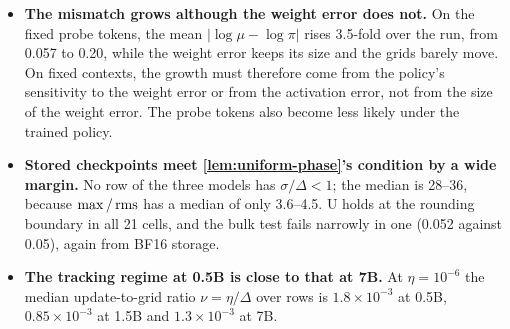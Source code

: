 \begin{itemize}[leftmargin=*,itemsep=2pt]
\begin{itemize}[leftmargin=*,itemsep=1pt]
  \end{itemize}
\item \textbf{The mismatch grows although the weight error does not.} On the fixed probe tokens, the mean $|\log\mu-\log\pi|$ rises 3.5-fold over the run, from 0.057 to 0.20, while the weight error keeps its size and the grids barely move. On fixed contexts, the growth must therefore come from the policy's sensitivity to the weight error or from the activation error, not from the size of the weight error. The probe tokens also become less likely under the trained policy.
\item \textbf{Stored checkpoints meet \cref{lem:uniform-phase}'s condition by a wide margin.} No row of the three models has $\sigma/\Delta<1$; the median is 28--36, because $\max/\operatorname{rms}$ has a median of only 3.6--4.5. U holds at the rounding boundary in all 21 cells, and the bulk test fails narrowly in one (0.052 against 0.05), again from BF16 storage.
\item \textbf{The tracking regime at 0.5B is close to that at 7B.} At $\eta=10^{-6}$ the median update-to-grid ratio $\nu=\eta/\Delta$ over rows is $1.8\times10^{-3}$ at 0.5B, $0.85\times10^{-3}$ at 1.5B and $1.3\times10^{-3}$ at 7B.
\end{itemize}
